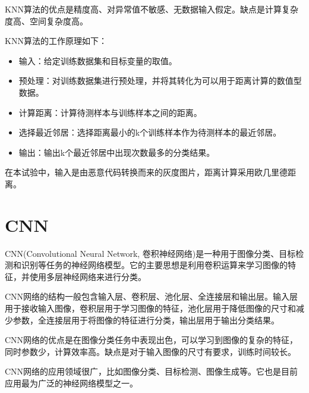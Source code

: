 KNN算法的优点是精度高、对异常值不敏感、无数据输入假定。缺点是计算复杂度高、空间复杂度高。

KNN算法的工作原理如下：
\begin{itemize}
  \item 输入：给定训练数据集和目标变量的取值。
  \item 预处理：对训练数据集进行预处理，并将其转化为可以用于距离计算的数值型数据。
  \item 计算距离：计算待测样本与训练样本之间的距离。
  \item 选择最近邻居：选择距离最小的k个训练样本作为待测样本的最近邻居。
  \item 输出：输出k个最近邻居中出现次数最多的分类结果。
\end{itemize}


在本试验中，输入是由恶意代码转换而来的灰度图片，距离计算采用欧几里德距离。


\section{CNN}

CNN(Convolutional Neural Network, 卷积神经网络)是一种用于图像分类、目标检测和识别等任务的神经网络模型。它的主要思想是利用卷积运算来学习图像的特征，并使用多层神经网络来进行分类。

CNN网络的结构一般包含输入层、卷积层、池化层、全连接层和输出层。输入层用于接收输入图像，卷积层用于学习图像的特征，池化层用于降低图像的尺寸和减少参数，全连接层用于将图像的特征进行分类，输出层用于输出分类结果。

CNN网络的优点是在图像分类任务中表现出色，可以学习到图像的复杂的特征，同时参数少，计算效率高。缺点是对于输入图像的尺寸有要求，训练时间较长。

CNN网络的应用领域很广，比如图像分类、目标检测、图像生成等。它也是目前应用最为广泛的神经网络模型之一。


